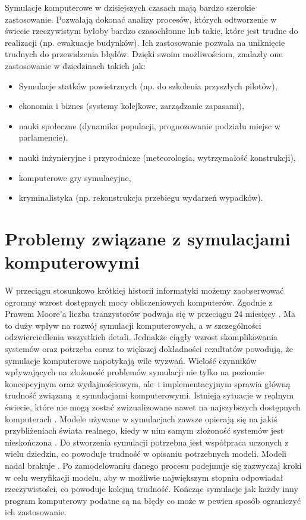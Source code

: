 Symulacje komputerowe w dzisiejszych czasach mają bardzo szerokie zastosowanie. Pozwalają dokonać analizy procesów, których odtworzenie w świecie rzeczywistym byłoby bardzo czasochłonne lub takie, które jest trudne do realizacji (np. ewakuacje budynków). Ich zastosowanie pozwala na uniknięcie trudnych do przewidzenia błędów. Dzięki swoim możliwościom, znalazły one zastosowanie w dziedzinach takich jak:

\begin{itemize}
\item Symulacje statków powietrznych (np. do szkolenia przyszłych pilotów),
\item ekonomia i biznes (systemy kolejkowe, zarządzanie zapasami),
\item nauki społeczne (dynamika populacji, prognozowanie podziału miejsc w parlamencie),
\item nauki inżynieryjne i przyrodnicze (meteorologia, wytrzymałość konstrukcji),
\item komputerowe gry symulacyjne,
\item kryminalistyka (np. rekonstrukcja przebiegu wydarzeń wypadków).
\end{itemize}

\section{Problemy związane z symulacjami komputerowymi}
\label{sec:ProblemyzSymulacjami}

W przeciągu stosunkowo krótkiej historii informatyki możemy zaobserwować ogromny wzrost dostępnych mocy obliczeniowych komputerów. Zgodnie z Prawem Moore'a liczba tranzystorów podwaja się w przeciągu 24 miesięcy \cite{mooreslaw}. Ma to duży wpływ na rozwój symulacji komputerowych, a w szczególności odzwierciedlenia wszystkich detali. Jednakże ciągły wzrost skomplikowania systemów oraz potrzeba coraz to większej dokładności rezultatów powodują, że symulacje komputerowe napotykają wile wyzwań. Wielość czynników wpływających na złożoność problemów symulacji nie tylko na poziomie koncepcyjnym oraz wydajnościowym, ale~i implementacyjnym sprawia główną trudność związaną~z symulacjami komputerowymi. Istnieją sytuacje w realnym świecie, które nie mogą zostać zwizualizowane nawet na najszybszych dostępnych komputerach \cite{simulationLimits}. Modele używane w symulacjach zawsze opierają się na jakiś przybliżeniach świata realnego, kiedy w nim samym złożoność systemów jest nieskończona \cite{simulationInGeneral}. Do stworzenia symulacji potrzebna jest współpraca uczonych z wielu dziedzin, co powoduje trudność w opisaniu potrzebnych modeli. Modeli nadal brakuje \cite{simulationChallenges}. Po zamodelowaniu danego procesu podejmuje się zazwyczaj kroki w celu weryfikacji modelu, aby w możliwie największym stopniu odpowiadał rzeczywistości, co powoduje kolejną trudność. Kończąc symulacje jak każdy inny program komputerowy podatne są na błędy co może w pewien sposób ograniczyć ich zastosowanie.
















